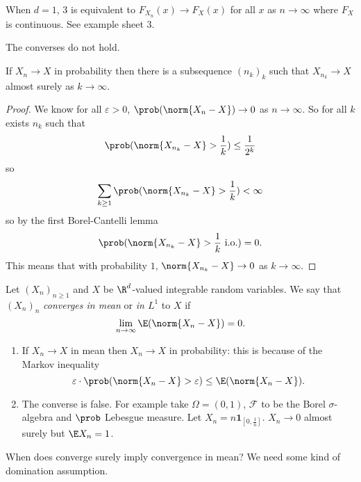 \documentclass[a4paper]{article}
\renewcommand{\P}{\prob} %
\begin{document}
\begin{remark}
  When \(d = 1\), 3 is equivalent to \(F_{X_n}(x) \to F_X(x)\) for all \(x\) as \(n \to \infty\) where \(F_X\) is continuous. See example sheet 3.
\end{remark}

The converses do not hold.

\begin{proposition}
  If \(X_n \to X\) in probability then there is a subsequence \((n_k)_k\) such that \(X_{n_k} \to X\) almost surely as \(k \to \infty\).
\end{proposition}

\begin{proof}
  We know for all \(\varepsilon > 0\), \(\P(\norm{X_n - X}) \to 0\) as \(n \to \infty\). So for all \(k\) exists \(n_k\) such that
  \[
    \P(\norm{X_{n_k} - X} > \frac{1}{k}) \leq \frac{1}{2^k}
  \]
  so
  \[
    \sum_{k \geq 1} \P(\norm{X_{n_k} - X} > \frac{1}{k}) < \infty
  \]
  so by the first Borel-Cantelli lemma
  \[
    \P(\norm{X_{n_k} - X} > \frac{1}{k} \text{ i.o.}) = 0.
  \]
  This means that with probability \(1\), \(\norm{X_{n_k} - X} \to 0\) as \(k \to \infty\).
\end{proof}

\begin{definition}
  Let \((X_n)_{n \geq 1}\) and \(X\) be \(\R^d\)-valued integrable random variables. We say that \((X_n)_n\) \emph{converges in mean} or \emph{in \(L^1\)} to \(X\) if
  \[
    \lim_{n \to \infty} \E(\norm{X_n - X}) = 0.
  \]
\end{definition}

\begin{remark}\leavevmode
  \begin{enumerate}
  \item If \(X_n \to X\) in mean then \(X_n \to X\) in probability: this is because of the Markov inequality
    \[
      \varepsilon \cdot \P(\norm{X_n - X} > \varepsilon) \leq \E(\norm{X_n - X}).
    \]
  \item The converse is false. For example take \(\Omega = (0, 1)\), \(\mathcal F\) to be the Borel \(\sigma\)-algebra and \(\P\) Lebesgue measure. Let \(X_n = n \mathbf 1_{[0, \frac{1}{n}]}\). \(X_n \to 0\) almost surely but \(\E X_n = 1\).
  \end{enumerate}
\end{remark}

When does converge surely imply convergence in mean? We need some kind of domination assumption.
\end{document}
